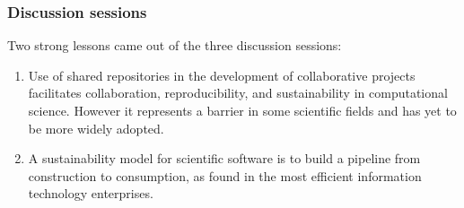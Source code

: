 \documentclass[11pt, oneside]{amsart}
\newcommand{\note}[1]{ {\textcolor{red}    { #1 }}}
\begin{document}
\subsubsection*{Discussion sessions}

Two strong lessons came out of the three discussion sessions:

\begin{enumerate}
\item Use of shared repositories in the development of collaborative
  projects facilitates collaboration, reproducibility, and
  sustainability in computational science. However it represents a
  barrier in some scientific fields and has yet to be more widely
  adopted.




\item A sustainability model for scientific software is to build a
  pipeline from construction to consumption, as found in the most
  efficient information technology enterprises.

\end{enumerate}

\end{document}
